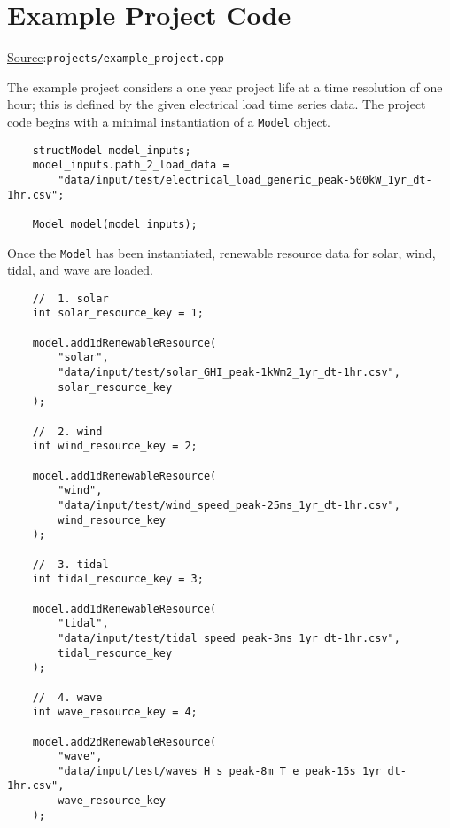 \documentclass[12pt, letterpaper]{report}
\begin{document}
\section{Example Project Code}

\begin{large}
\noindent\underline{Source}:\quad\texttt{projects/example\_project.cpp}\par
\end{large}
\vspace{5mm}

The example project considers a one year project life at a time resolution of one hour; this is defined by the given electrical load time series data. The project code begins with a minimal instantiation of a \texttt{Model} object.

\begin{verbatim}
    structModel model_inputs;
    model_inputs.path_2_load_data =
        "data/input/test/electrical_load_generic_peak-500kW_1yr_dt-1hr.csv";
    
    Model model(model_inputs);
\end{verbatim}

\noindent Once the \texttt{Model} has been instantiated, renewable resource data for solar, wind, tidal, and wave are loaded.

\newpage
\begin{verbatim}
    //  1. solar
    int solar_resource_key = 1;
     
    model.add1dRenewableResource(
        "solar",
        "data/input/test/solar_GHI_peak-1kWm2_1yr_dt-1hr.csv",
        solar_resource_key
    );
    
    //  2. wind
    int wind_resource_key = 2;
     
    model.add1dRenewableResource(
        "wind",
        "data/input/test/wind_speed_peak-25ms_1yr_dt-1hr.csv",
        wind_resource_key
    );
    
    //  3. tidal
    int tidal_resource_key = 3;
     
    model.add1dRenewableResource(
        "tidal",
        "data/input/test/tidal_speed_peak-3ms_1yr_dt-1hr.csv",
        tidal_resource_key
    );
    
    //  4. wave
    int wave_resource_key = 4;
    
    model.add2dRenewableResource(
        "wave",
        "data/input/test/waves_H_s_peak-8m_T_e_peak-15s_1yr_dt-1hr.csv",
        wave_resource_key
    );
\end{verbatim}
\end{document}
